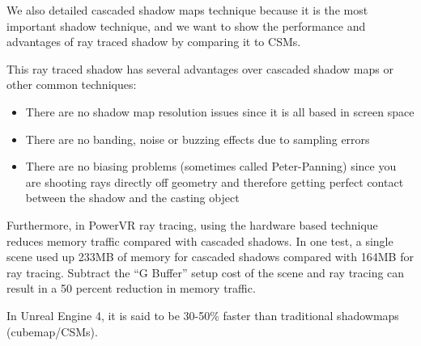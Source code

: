 We also detailed cascaded shadow maps technique because it is the most important shadow technique, and we want to show the performance and advantages of ray traced shadow by comparing it to CSMs.

This ray traced shadow has several advantages over cascaded shadow maps or other common techniques:

\begin{itemize}
	\item There are no shadow map resolution issues since it is all based in screen space
	\item There are no banding, noise or buzzing effects due to sampling errors
	\item There are no biasing problems (sometimes called Peter-Panning) since you are shooting rays directly off geometry and therefore getting perfect contact between the shadow and the casting object
\end{itemize}


Furthermore, in PowerVR ray tracing, using the hardware based technique reduces memory traffic compared with cascaded shadows. In one test, a single scene used up 233MB of memory for cascaded shadows compared with 164MB for ray tracing. Subtract the “G Buffer” setup cost of the scene and ray tracing can result in a 50 percent reduction in memory traffic. 

In Unreal Engine 4, it is said to be 30-50\% faster than traditional shadowmaps (cubemap/CSMs).